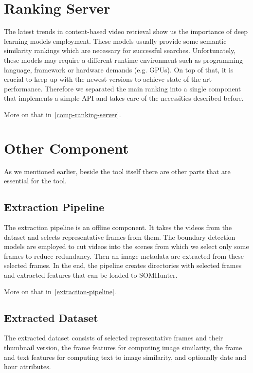 \section{Ranking Server}

The latest trends in content-based video retrieval show us the importance of deep learning models employment. These models usually provide some semantic similarity rankings which are necessary for successful searches. Unfortunately, these models may require a different runtime environment such as programming language, framework or hardware demands (e.g. GPUs). On top of that, it is crucial to keep up with the newest versions to achieve state-of-the-art performance. Therefore we separated the main ranking into a single component that implements a simple API and takes care of the necessities described before.

More on that in~\cref{comp-ranking-server}.


\section{Other Component}
As we mentioned earlier, beside the tool itself there are other parts that are essential for the tool.

\subsection{Extraction Pipeline}

The extraction pipeline is an offline component. It takes the videos from the dataset and selects representative frames from them. The boundary detection models are employed to cut videos into the scenes from which we select only some frames to reduce redundancy. Then an image metadata are extracted from these selected frames. In the end, the pipeline creates directories with selected frames and extracted features that can be loaded to SOMHunter.

More on that in~\cref{extraction-pipeline}.

\subsection{Extracted Dataset}

The extracted dataset consists of selected representative frames and their thumbnail version, the frame features for computing image similarity, the frame and text features for computing text to image similarity, and optionally date and hour attributes.

